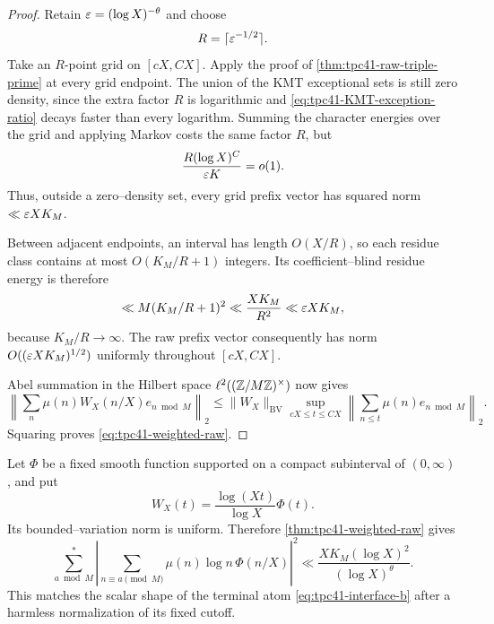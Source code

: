 \begin{proof}
Retain \(\varepsilon=(\log X)^{-\theta}\) and choose
\begin{equation}
 R=\lceil\varepsilon^{-1/2}\rceil.
 \label{eq:tpc41-grid-R}
\end{equation}
Take an \(R\)-point grid on \([cX,CX]\).  Apply the proof of
\cref{thm:tpc41-raw-triple-prime} at every grid endpoint.  The union of
the KMT exceptional sets is still zero density, since the extra factor
\(R\) is logarithmic and
\eqref{eq:tpc41-KMT-exception-ratio} decays faster than every logarithm.
Summing the character energies over the grid and applying Markov costs the
same factor \(R\), but
\begin{equation}
 \frac{R(\log X)^C}{\varepsilon K}=o(1).
 \label{eq:tpc41-grid-character-Markov}
\end{equation}
Thus, outside a zero--density set, every grid prefix vector has squared
norm \(\ll\varepsilon XK_M\).

Between adjacent endpoints, an interval has length \(O(X/R)\), so each
residue class contains at most \(O(K_M/R+1)\) integers.  Its
coefficient--blind residue energy is therefore
\begin{equation}
 \ll M(K_M/R+1)^2
 \ll\frac{XK_M}{R^2}
 \ll\varepsilon XK_M,
 \label{eq:tpc41-short-block-energy}
\end{equation}
because \(K_M/R\to\infty\).  The raw prefix vector consequently has
norm \(O((\varepsilon XK_M)^{1/2})\) uniformly throughout \([cX,CX]\).

Abel summation in the Hilbert space
\(\ell^2((\mathbb Z/M\mathbb Z)^\times)\) now gives
\begin{equation}
 \left\|
  \sum_n\mu(n)W_X(n/X)e_{n\bmod M}
 \right\|_2
 \le \|W_X\|_{\mathrm{BV}}
 \sup_{cX\le t\le CX}
 \left\|\sum_{n\le t}\mu(n)e_{n\bmod M}\right\|_2.
 \label{eq:tpc41-Hilbert-Abel}
\end{equation}
Squaring proves \eqref{eq:tpc41-weighted-raw}.
\end{proof}

Let \(\Phi\) be a fixed smooth function supported on a compact subinterval
of \((0,\infty)\), and put
\begin{equation}
 W_X(t)=\frac{\log(Xt)}{\log X}\Phi(t).
 \label{eq:tpc41-terminal-W}
\end{equation}
Its bounded--variation norm is uniform.  Therefore
\cref{thm:tpc41-weighted-raw} gives
\begin{equation}
 \sum_{a\bmod M}^{*}
 \left|
  \sum_{n\equiv a\pmod M}
  \mu(n)\log n\,\Phi(n/X)
 \right|^2
 \ll
 \frac{XK_M(\log X)^2}{(\log X)^\theta}.
 \label{eq:tpc41-terminal-log-weight}
\end{equation}
This matches the scalar shape of the terminal atom
\eqref{eq:tpc41-interface-b} after a harmless normalization of its fixed
cutoff.

